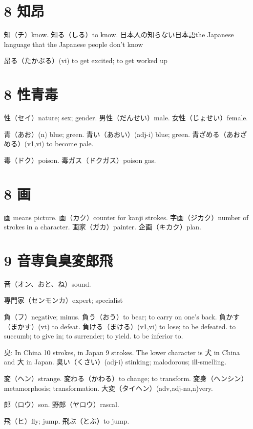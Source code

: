 \section{8 知昂}

知（チ）know.
知る（しる）to know.
日本人の知らない日本語the Japanese language that the Japanese people don't know

昂る（たかぶる）(vi) to get excited; to get worked up

\section{8 性青毒}

性（セイ）nature; sex; gender.
男性（だんせい）male.
女性（じょせい）female.

青（あお）(n) blue; green.
青い（あおい）(adj-i) blue; green.
青ざめる（あおざめる）(v1,vi) to become pale.

毒（ドク）poison.
毒ガス（ドクガス）poison gas.

\section{8 画}

画 means picture.
画（カク）counter for kanji strokes.
字画（ジカク）number of strokes in a character.
画家（ガカ）painter.
企画（キカク）plan.

\section{9 音専負臭変郎飛}

音（オン、おと、ね）sound.

専門家（センモンカ）expert; specialist

負（フ）negative; minus.
負う（おう）to bear; to carry on one's back.
負かす（まかす）(vt) to defeat.
負ける（まける）(v1,vi)
to lose; to be defeated.
to succumb; to give in; to surrender; to yield.
to be inferior to.

臭: In China 10 strokes, in Japan 9 strokes.
The lower character is 犬 in China and 大 in Japan.
臭い（くさい）(adj-i) stinking; malodorous; ill-smelling.

変（ヘン）strange.
変わる（かわる）to change; to transform.
変身（ヘンシン）metamorphosis; transformation.
大変（タイヘン）(adv,adj-na,n)very.

郎（ロウ）son.
野郎（ヤロウ）rascal.

飛（ヒ）fly; jump.
飛ぶ（とぶ）to jump.

